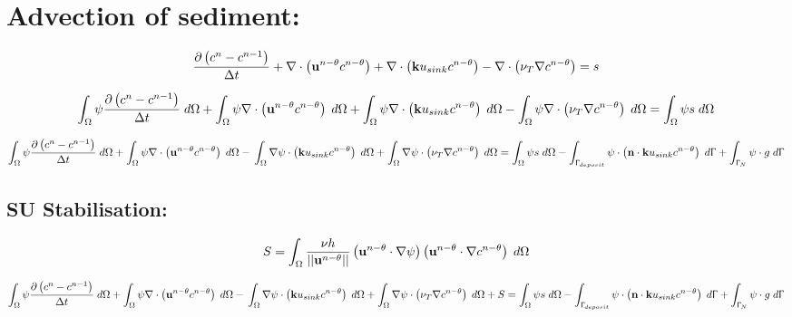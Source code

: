 \documentclass[11pt,a4paper]{article}
\begin{document}
\section{Advection of sediment:}

\begin{dmath}
  \frac{\partial \left( c^{n} - c^{n-1}\right)}{\Delta t} + \nabla \cdot \left( {\bf u}^{n-\theta} c^{n-\theta} \right) + \nabla \cdot \left( {\bf k} u_{sink} c^{n-\theta} \right)- \nabla \cdot \left( \nu_T \nabla c^{n-\theta} \right) = s
\end{dmath}

\begin{dmath}
  \int_\Omega \psi \frac{\partial \left( c^{n} - c^{n-1}\right)}{\Delta t} \; d\Omega +\int_\Omega  \psi \nabla \cdot \left( {\bf u}^{n-\theta} c^{n-\theta} \right) \; d\Omega + \int_\Omega \psi \nabla \cdot \left( {\bf k} u_{sink} c^{n-\theta} \right)  \; d\Omega - \int_\Omega \psi \nabla \cdot \left( \nu_T \nabla c^{n-\theta} \right) \; d\Omega = \int_\Omega \psi s \; d\Omega
\end{dmath}

\begin{dmath}
  \int_\Omega \psi \frac{\partial \left( c^{n} - c^{n-1}\right)}{\Delta t} \; d\Omega +\int_\Omega  \psi \nabla \cdot \left( {\bf u}^{n-\theta} c^{n-\theta} \right) \; d\Omega - \\ \int_\Omega \nabla \psi \cdot \left( {\bf k} u_{sink} c^{n-\theta} \right)  \; d\Omega + \int_\Omega \nabla \psi \cdot \left( \nu_T \nabla c^{n-\theta} \right) \; d\Omega = \int_\Omega \psi s \; d\Omega - \int_{\Upgamma_{deposit}} \psi \cdot \left( {\bf n} \cdot {\bf k} u_{sink} c^{n-\theta} \right) \; d\Upgamma + \int_{\Upgamma_N} \psi \cdot g \; d\Upgamma 
\end{dmath}

\subsection{SU Stabilisation:}

\begin{dmath}
  S = \int_\Omega \frac{\nu h}{||{\bf u}^{n-\theta}||} \left( {\bf u}^{n-\theta} \cdot \nabla \psi \right) \left( {\bf u}^{n-\theta} \cdot \nabla c^{n-\theta} \right)  \; d\Omega
\end{dmath}

\begin{dmath}
  \int_\Omega \psi \frac{\partial \left( c^{n} - c^{n-1}\right)}{\Delta t} \; d\Omega +\int_\Omega  \psi \nabla \cdot \left( {\bf u}^{n-\theta} c^{n-\theta} \right) \; d\Omega - \\ \int_\Omega \nabla \psi \cdot \left( {\bf k} u_{sink} c^{n-\theta} \right)  \; d\Omega + \int_\Omega \nabla \psi \cdot \left( \nu_T \nabla c^{n-\theta} \right) \; d\Omega + S = \int_\Omega \psi s \; d\Omega - \int_{\Upgamma_{deposit}} \psi \cdot \left( {\bf n} \cdot {\bf k} u_{sink} c^{n-\theta} \right) \; d\Upgamma + \int_{\Upgamma_N} \psi \cdot g \; d\Upgamma 
\end{dmath}
\end{document}
